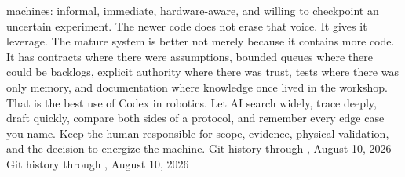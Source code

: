 {}machines: informal, immediate, hardware-aware, and willing to checkpoint an\markdownRendererSoftLineBreak
{}uncertain experiment. The newer code does not erase that voice. It gives it\markdownRendererSoftLineBreak
{}leverage.\markdownRendererParagraphSeparator
{}The mature system is better not merely because it contains more code. It has\markdownRendererSoftLineBreak
{}contracts where there were assumptions, bounded queues where there could be\markdownRendererSoftLineBreak
{}backlogs, explicit authority where there was trust, tests where there was only\markdownRendererSoftLineBreak
{}memory, and documentation where knowledge once lived in the workshop.\markdownRendererParagraphSeparator
{}That is the best use of Codex in robotics. Let AI search widely, trace deeply,\markdownRendererSoftLineBreak
{}draft quickly, compare both sides of a protocol, and remember every edge case\markdownRendererSoftLineBreak
{}you name. Keep the human responsible for scope, evidence, physical validation,\markdownRendererSoftLineBreak
{}and the decision to energize the machine.\markdownRendererInterblockSeparator
{}\markdownRendererThematicBreak{}\markdownRendererInterblockSeparator
{}
\markdownRendererSectionEnd \markdownRendererSectionBegin
{}\markdownRendererInterblockSeparator
{}\markdownRendererSectionBegin
{}\markdownRendererInterblockSeparator
{}\markdownRendererUlBegin
\markdownRendererUlItem {} Git history through , August 10, 2026\markdownRendererUlItemEnd 
\markdownRendererUlItem {} Git history through , August 10, 2026\markdownRendererUlItemEnd 
\markdownRendererUlItem {}\markdownRendererUlItemEnd 
\markdownRendererUlItem {}\markdownRendererUlItemEnd 
\markdownRendererUlItem {}\markdownRendererUlItemEnd 
\markdownRendererUlItem {}\markdownRendererUlItemEnd 
\markdownRendererUlItem {}\markdownRendererUlItemEnd 
\markdownRendererUlItem {}\markdownRendererUlItemEnd 
\markdownRendererUlItem {}\markdownRendererUlItemEnd 
